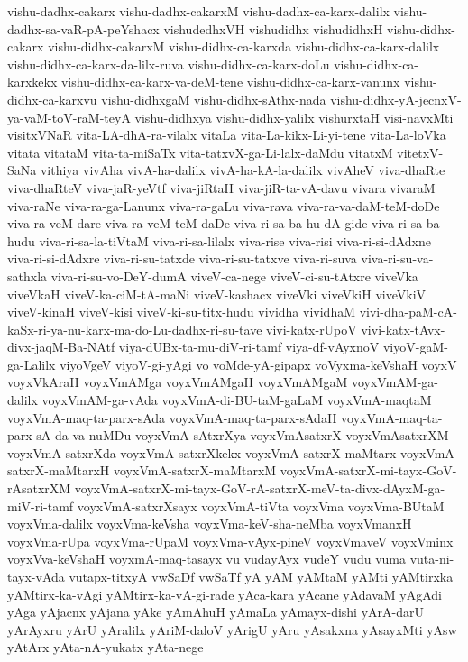{vishu-dadhx-cakarx
vishu-dadhx-cakarxM
vishu-dadhx-ca-karx-dalilx
vishu-dadhx-sa-vaR-pA-peYshacx
vishudedhxVH
vishudidhx
vishudidhxH
vishu-didhx-cakarx
vishu-didhx-cakarxM
vishu-didhx-ca-karxda
vishu-didhx-ca-karx-dalilx
vishu-didhx-ca-karx-da-lilx-ruva
vishu-didhx-ca-karx-doLu
vishu-didhx-ca-karxkekx
vishu-didhx-ca-karx-va-deM-tene
vishu-didhx-ca-karx-vanunx
vishu-didhx-ca-karxvu
vishu-didhxgaM
vishu-didhx-sAthx-nada
vishu-didhx-yA-jecnxV-ya-vaM-toV-raM-teyA
vishu-didhxya
vishu-didhx-yalilx
vishurxtaH
visi-navxMti
visitxVNaR
vita-LA-dhA-ra-vilalx
vitaLa
vita-La-kikx-Li-yi-tene
vita-La-loVka
vitata
vitataM
vita-ta-miSaTx
vita-tatxvX-ga-Li-lalx-daMdu
vitatxM
vitetxV-SaNa
vithiya
vivAha
vivA-ha-dalilx
vivA-ha-kA-la-dalilx
vivAheV
viva-dhaRte
viva-dhaRteV
viva-jaR-yeVtf
viva-jiRtaH
viva-jiR-ta-vA-davu
vivara
vivaraM
viva-raNe
viva-ra-ga-Lanunx
viva-ra-gaLu
viva-rava
viva-ra-va-daM-teM-doDe
viva-ra-veM-dare
viva-ra-veM-teM-daDe
viva-ri-sa-ba-hu-dA-gide
viva-ri-sa-ba-hudu
viva-ri-sa-la-tiVtaM
viva-ri-sa-lilalx
viva-rise
viva-risi
viva-ri-si-dAdxne
viva-ri-si-dAdxre
viva-ri-su-tatxde
viva-ri-su-tatxve
viva-ri-suva
viva-ri-su-va-sathxla
viva-ri-su-vo-DeY-dumA
viveV-ca-nege
viveV-ci-su-tAtxre
viveVka
viveVkaH
viveV-ka-ciM-tA-maNi
viveV-kashacx
viveVki
viveVkiH
viveVkiV
viveV-kinaH
viveV-kisi
viveV-ki-su-titx-hudu
vividha
vividhaM
vivi-dha-paM-cA-kaSx-ri-ya-nu-karx-ma-do-Lu-dadhx-ri-su-tave
vivi-katx-rUpoV
vivi-katx-tAvx-divx-jaqM-Ba-NAtf
viya-dUBx-ta-mu-diV-ri-tamf
viya-df-vAyxnoV
viyoV-gaM-ga-Lalilx
viyoVgeV
viyoV-gi-yAgi
vo
voMde-yA-gipapx
voVyxma-keVshaH
voyxV
voyxVkAraH
voyxVmAMga
voyxVmAMgaH
voyxVmAMgaM
voyxVmAM-ga-dalilx
voyxVmAM-ga-vAda
voyxVmA-di-BU-taM-gaLaM
voyxVmA-maqtaM
voyxVmA-maq-ta-parx-sAda
voyxVmA-maq-ta-parx-sAdaH
voyxVmA-maq-ta-parx-sA-da-va-nuMDu
voyxVmA-sAtxrXya
voyxVmAsatxrX
voyxVmAsatxrXM
voyxVmA-satxrXda
voyxVmA-satxrXkekx
voyxVmA-satxrX-maMtarx
voyxVmA-satxrX-maMtarxH
voyxVmA-satxrX-maMtarxM
voyxVmA-satxrX-mi-tayx-GoV-rAsatxrXM
voyxVmA-satxrX-mi-tayx-GoV-rA-satxrX-meV-ta-divx-dAyxM-ga-miV-ri-tamf
voyxVmA-satxrXsayx
voyxVmA-tiVta
voyxVma
voyxVma-BUtaM
voyxVma-dalilx
voyxVma-keVsha
voyxVma-keV-sha-neMba
voyxVmanxH
voyxVma-rUpa
voyxVma-rUpaM
voyxVma-vAyx-pineV
voyxVmaveV
voyxVminx
voyxVva-keVshaH
voyxmA-maq-tasayx
vu
vudayAyx
vudeY
vudu
vuma
vuta-ni-tayx-vAda
vutapx-titxyA
vwSaDf
vwSaTf
yA
yAM
yAMtaM
yAMti
yAMtirxka
yAMtirx-ka-vAgi
yAMtirx-ka-vA-gi-rade
yAca-kara
yAcane
yAdavaM
yAgAdi
yAga
yAjacnx
yAjana
yAke
yAmAhuH
yAmaLa
yAmayx-dishi
yArA-darU
yArAyxru
yArU
yAralilx
yAriM-daloV
yArigU
yAru
yAsakxna
yAsayxMti
yAsw
yAtArx
yAta-nA-yukatx
yAta-nege
}

